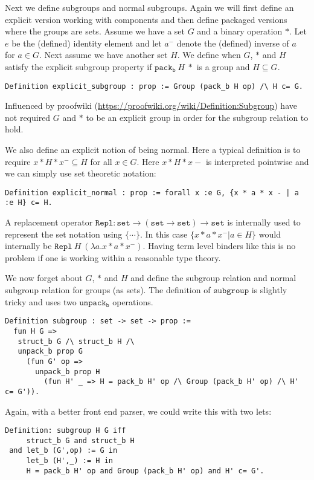 \documentclass{article}
\begin{document}
Next we define subgroups and normal subgroups. Again we will first define an explicit version
working with components and then define packaged versions where the groups are sets.
Assume we have a set $G$ and a binary operation $*$.
Let $e$ be the (defined) identity element and let $a^-$ denote the (defined) inverse of $a$
for $a\in G$.
Next assume we have another set $H$. We define when $G$, $*$ and $H$ satisfy the explicit subgroup property
if $\mathtt{pack_b}~H~*$ is a group and $H\subseteq G$.
\begin{verbatim}
Definition explicit_subgroup : prop := Group (pack_b H op) /\ H c= G.
\end{verbatim}
Influenced by proofwiki (\url{https://proofwiki.org/wiki/Definition:Subgroup}) have not required $G$ and $*$ to be an
explicit group in order for the subgroup relation to hold.

We also define an explicit notion of being normal. Here a typical definition is to require $x * H * x^-\subseteq H$
for all $x\in G$. Here $x * H * x-$ is interpreted pointwise and we can simply use set theoretic notation:
\begin{verbatim}
Definition explicit_normal : prop := forall x :e G, {x * a * x - | a :e H} c= H.
\end{verbatim}
A replacement operator $\mathtt{Repl}:\mathtt{set}\to(\mathtt{set}\to\mathtt{set})\to\mathtt{set}$
is internally used to represent the set notation using $\{\cdots\}$.
In this case $\{x * a * x^- |a\in H\}$ would internally be
$\mathtt{Repl}~H~(\lambda a.x * a * x^-)$.
Having term level binders like this is no problem if one is working within a reasonable type theory.

We now forget about $G$, $*$ and $H$ and define the subgroup relation and normal subgroup relation
for groups (as sets). The definition of $\mathtt{subgroup}$ is slightly tricky and uses two $\mathtt{unpack_b}$ operations.
\begin{verbatim}
Definition subgroup : set -> set -> prop :=
  fun H G =>
   struct_b G /\ struct_b H /\
   unpack_b prop G
     (fun G' op =>
       unpack_b prop H
         (fun H' _ => H = pack_b H' op /\ Group (pack_b H' op) /\ H' c= G')).
\end{verbatim}
Again, with a better front end parser, we could write this with two lets:
\begin{verbatim}
Definition: subgroup H G iff
     struct_b G and struct_b H
 and let_b (G',op) := G in
     let_b (H',_) := H in
     H = pack_b H' op and Group (pack_b H' op) and H' c= G'.
\end{verbatim}
\end{document}
